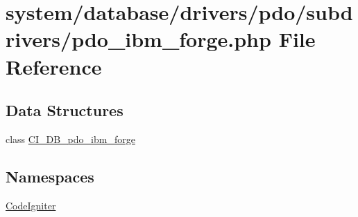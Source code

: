 \hypertarget{pdo__ibm__forge_8php}{}\section{system/database/drivers/pdo/subdrivers/pdo\+\_\+ibm\+\_\+forge.php File Reference}
\label{pdo__ibm__forge_8php}
\subsection*{Data Structures}
\begin{DoxyCompactItemize}
\item 
class \mbox{\hyperlink{class_c_i___d_b__pdo__ibm__forge}{C\+I\+\_\+\+D\+B\+\_\+pdo\+\_\+ibm\+\_\+forge}}
\end{DoxyCompactItemize}
\subsection*{Namespaces}
\begin{DoxyCompactItemize}
\item 
 \mbox{\hyperlink{namespace_code_igniter}{Code\+Igniter}}
\end{DoxyCompactItemize}
